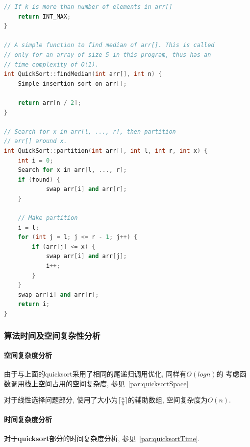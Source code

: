 \begin{lstlisting}[language=c++]
    // If k is more than number of elements in arr[]
    return INT_MAX;
}

// A simple function to find median of arr[]. This is called
// only for an array of size 5 in this program, thus has an
// time complexity of O(1).
int QuickSort::findMedian(int arr[], int n) {
  	Simple insertion sort on arr[];

    return arr[n / 2];
}

// Search for x in arr[l, ..., r], then partition
// arr[] around x.
int QuickSort::partition(int arr[], int l, int r, int x) {
    int i = 0;
    Search for x in arr[l, ..., r];
    if (found) {
			swap arr[i] and arr[r];
    }

    // Make partition
    i = l;
    for (int j = l; j <= r - 1; j++) {
        if (arr[j] <= x) {
            swap arr[i] and arr[j];
            i++;
        }
    }
  	swap arr[i] and arr[r];
    return i;
}
\end{lstlisting}

\subsubsection{算法时间及空间复杂性分析}
\paragraph{空间复杂度分析}
由于与上面的quicksort采用了相同的尾递归调用优化, 同样有$O(log{n})$的
考虑函数调用栈上空间占用的空间复杂度, 参见~\ref{par:quicksortSpace}\par
对于线性选择问题部分, 使用了大小为$\lceil\frac{n}{5}\rceil$的辅助数组,
空间复杂度为$O(n)$.

\paragraph{时间复杂度分析}
对于\textbf{quicksort}部分的时间复杂度分析, 参见~\ref{par:quicksortTime}.\par


